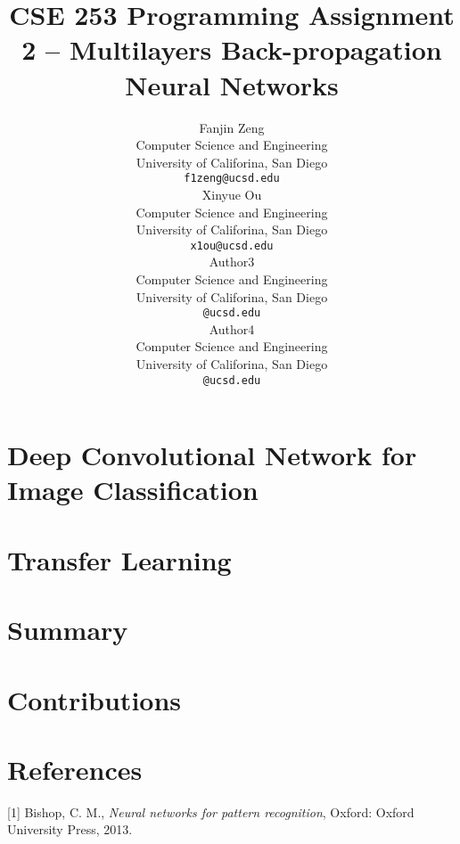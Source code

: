 \documentclass{article}
\title{CSE 253 Programming Assignment 2 -- Multilayers Back-propagation Neural Networks}
\author{
  Fanjin Zeng \\
  Computer Science and Engineering\\
  University of Califorina, San Diego\\
  \texttt{f1zeng@ucsd.edu} \\
   \And
   Xinyue Ou \\
   Computer Science and Engineering\\
   University of Califorina, San Diego \\
   \texttt{x1ou@ucsd.edu} \\
   \And
   Author3 \\
   Computer Science and Engineering\\
   University of Califorina, San Diego \\
   \texttt{@ucsd.edu} \\
   Author4 \\
   Computer Science and Engineering\\
   University of Califorina, San Diego \\
   \texttt{@ucsd.edu} \\
}
\begin{document}
\maketitle
\begin{abstract}

\end{abstract}

\section{Deep Convolutional Network for Image Classification}

\newpage
\section{Transfer Learning}

\newpage
\section{Summary}

\section{Contributions}



\section{References}
[1] Bishop, C. M., {\it Neural networks for pattern recognition}, Oxford: Oxford University Press, 2013.
\end{document}
